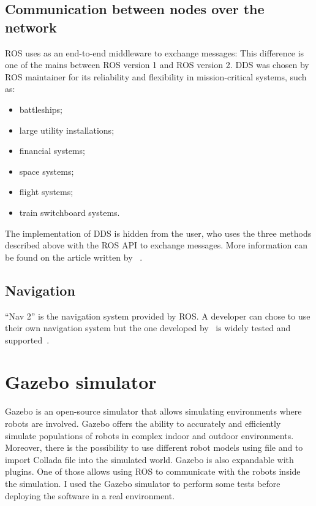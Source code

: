 \documentclass[../thesis.tex]{subfiles}
\begin{document}
\subsection{Communication between nodes over the network}
\gls{ROS} uses  as an end-to-end middleware to exchange messages:  This difference is one of the mains between \gls{ROS} version 1 and \gls{ROS} version 2. \gls{DDS} was chosen by \gls{ROS} maintainer for its reliability and flexibility in mission-critical systems, such as:
\begin{itemize}
    \item battleships;
    \item large utility installations;
    \item financial systems;
    \item space systems;
    \item flight systems;
    \item train switchboard systems.
\end{itemize}
The implementation of \gls{DDS} is hidden from the user, who uses the three methods described above with the \gls{ROS} API to exchange messages. More information can be found on the article written by \citeauthor{site:ros_dds}~\cite{site:ros_dds}.

\subsection{Navigation}
``Nav 2'' is the navigation system provided by \gls{ROS}. A developer can chose to use their own navigation system but the one developed by~\citeauthor{paper:navigation2} is widely tested and supported~\cite{paper:navigation2}. 

\section{Gazebo simulator}
Gazebo is an open-source simulator that allows simulating environments where robots are involved. Gazebo offers the ability to accurately and efficiently simulate populations of robots in complex indoor and outdoor environments. Moreover, there is the possibility to use different robot models using  file and to import Collada file into the simulated world. Gazebo is also expandable with plugins. One of those allows using \acrshort{ROS} to communicate with the robots inside the simulation. I used the Gazebo simulator to perform some tests before deploying the software in a real environment. 
\end{document}

